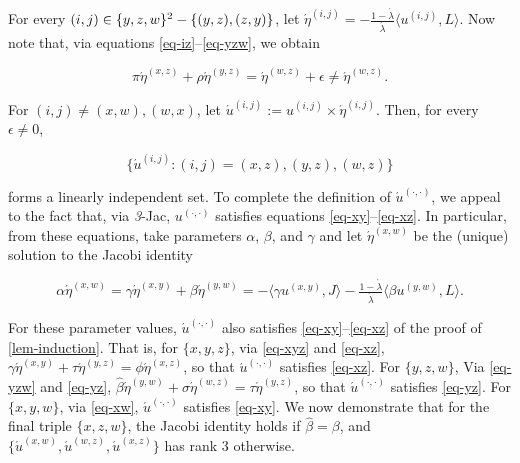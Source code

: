 \documentclass[12pt,a4paper,twoside]{article}
\renewcommand{\ij}{{(i, j)}}
\newcommand{\xy}{{(x, y)}}
\newcommand{\yz}{{(y,z)}}
\newcommand{\xz}{{(x,z)}}
\newcommand{\xw}{{(x,w)}}
\newcommand{\yw}{{(y,w)}}
\newcommand{\wz}{(w,z)}
\newcommand{\dd}{{(\cdot,\cdot)}}
\newcommand{\threejac}{\textup{\textit{3}-Jac}}
\begin{document}
\begin{appendices}
For every $(i, j) \in \{y,z,w\}^2 - \{(y, z), (z, y)\}$, let
$\acute{\eta}^{\ij} = - \frac{1 - \acute{\lambda}}{\acute{\lambda}} \langle
u^{\ij}, L \rangle$.  Now note that, via equations
\eqref{eq-iz}--\eqref{eq-yzw}, we obtain
\begin{linenomath*}
  \begin{equation}\label{eq-3d-epsilon}
    \pi \acute{\eta}^{\xz} + \rho \acute{\eta}^{\yz} = \acute{\eta}^{\wz} +
    \epsilon \neq \acute{\eta}^{\wz}.
  \end{equation}
\end{linenomath*}
For $(i, j) \neq (x, w), (w, x)$, let $\acute{u}^{\ij}:= u^{\ij} \times
\acute{\eta}^{\ij}$.  Then, for every $\epsilon\neq 0$, 
\begin{linenomath*}
  \begin{equation}
    \{\acute{u}^{\ij}: \ij = \xz, \yz, \wz\}
  \end{equation}
\end{linenomath*}
  forms a linearly independent set.  To complete the definition of
  $\acute{u}^{\dd}$, we appeal to the fact that, via \threejac, $u^{\dd}$
  satisfies equations \eqref{eq-xy}--\eqref{eq-xz}. In particular, from these
  equations, take parameters $\alpha$, $\beta$, and $\gamma$ and let
  $\acute{\eta}^{\xw}$ be the (unique) solution to the Jacobi identity
\begin{linenomath*}
  \begin{equation}\label{eq-xw}
    \alpha \acute{\eta}^{\xw} = \gamma \acute{\eta}^{\xy} + \beta
    \acute{\eta}^{\yw} = -\langle \gamma u^{\xy} , J \rangle -
    \tfrac{1-\acute{\lambda}}{\acute{\lambda}}\langle\beta u^{\yw}, L \rangle.
  \end{equation}
\end{linenomath*}
For these parameter values, $\acute{u}^{\dd}$ also satisfies
\eqref{eq-xy}--\eqref{eq-xz} of the proof of \cref{lem-induction}. That is, for
$\{x,y,z\}$, via \cref{eq-xyz} and \eqref{eq-xz}, $\gamma
\acute{\eta}^{\xy}+\tau \acute{\eta}^{\yz} = \phi \acute{\eta}^{\xz}$, so that
$\acute{u}^{\dd}$ satisfies \eqref{eq-xz}. For $\{y,z,w\}$, Via \cref{eq-yzw}
and \eqref{eq-yz}, $\hat{\beta} \acute{\eta}^{\yw}+\sigma \acute{\eta}^{\wz} =
\tau \acute{\eta}^{\yz}$, so that $\acute{u}^{\dd}$ satisfies \eqref{eq-yz}.
For $\{x,y,w\}$, via \cref{eq-xw}, $\acute{u}^{\dd}$ satisfies \eqref{eq-xy}.
We now demonstrate that for the final triple $\{x,z,w\}$, the Jacobi identity
holds if $\hat{\beta} = \beta$, and
$\{\acute{u}^{\xw},\acute{u}^{\wz},\acute{u}^{\xz}\}$ has rank $3$ otherwise.


\end{appendices}
\end{document}
